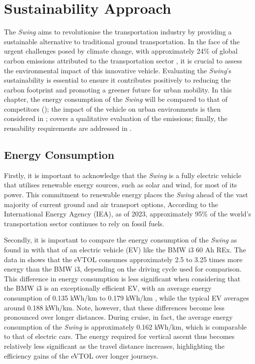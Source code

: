 \chapter{Sustainability Approach}  %
\label{ch:Sustainability_Approach}
The \textit{Swing} aims to revolutionise the transportation industry by providing a sustainable alternative to traditional ground transportation.
In the face of the urgent challenges posed by climate change, with approximately 24\% of global carbon emissions attributed to the transportation sector \cite{CO2Transport}, it is crucial to assess the environmental impact of this innovative vehicle.
Evaluating the \textit{Swing}’s sustainability is essential to ensure it contributes positively to reducing the carbon footprint and promoting a greener future for urban mobility. In this chapter, the energy consumption of the \textit{Swing} will be compared to that of competitors (); the impact of the vehicle on urban environments is then considered in ;  covers a qualitative evaluation of the emissions; finally, the reusability requirements are addressed in .



\section{Energy Consumption}
\label{sec:energyconsumption}
Firstly, it is important to acknowledge that the \textit{Swing} is a fully electric vehicle that utilises renewable energy sources, such as solar and wind, for most of its power.
This commitment to renewable energy places the \textit{Swing} ahead of the vast majority of current ground and air transport options, According to the International Energy Agency (IEA), as of 2023, approximately 95\% of the world’s transportation sector continues to rely on fossil fuels.

Secondly, it is important to compare the energy consumption of the \textit{Swing} as found in  with that of an electric vehicle (EV) like the BMW i3 60 Ah REx. The data in  shows that the eVTOL consumes approximately 2.5 to 3.25 times more energy than the BMW i3, depending on the driving cycle used for comparison. This difference in energy consumption is less significant when considering that the BMW i3 is an exceptionally efficient EV, with an average energy consumption of 0.135 kWh/km to 0.179 kWh/km \cite{miri2021electric}, while the typical EV averages around 0.188 kWh/km. Note, however, that these differences become less pronounced over longer distances. During cruise, in fact, the average energy consumption of the \textit{Swing} is approximately 0.162 kWh/km, which is comparable to that of electric cars. The energy required for vertical ascent thus becomes relatively less significant as the travel distance increases, highlighting the efficiency gains of the eVTOL over longer journeys.

